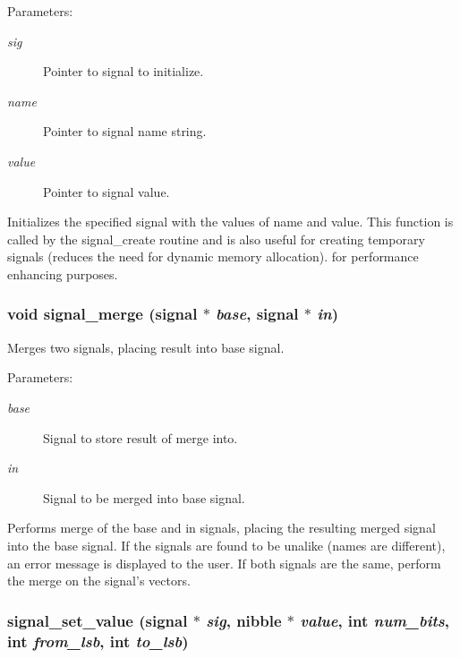 \begin{Desc}
\item[Parameters: ]\par
\begin{description}
\item[{\em 
sig}]Pointer to signal to initialize. \item[{\em 
name}]Pointer to signal name string. \item[{\em 
value}]Pointer to signal value.\end{description}
\end{Desc}
Initializes the specified signal with the values of name and value. This function is called by the signal\_\-create routine and is also useful for creating temporary signals (reduces the need for dynamic memory allocation). for performance enhancing purposes. 
\subsubsection{\setlength{\rightskip}{0pt plus 5cm}void signal\_\-merge ({\bf signal} $\ast$ {\em base}, {\bf signal} $\ast$ {\em in})}\label{signal_8c_a2}


Merges two signals, placing result into base signal.

\begin{Desc}
\item[Parameters: ]\par
\begin{description}
\item[{\em 
base}]Signal to store result of merge into. \item[{\em 
in}]Signal to be merged into base signal.\end{description}
\end{Desc}
Performs merge of the base and in signals, placing the resulting merged signal into the base signal. If the signals are found to be unalike (names are different), an error message is displayed to the user. If both signals are the same, perform the merge on the signal's vectors. 
\subsubsection{ signal\_\-set\_\-value ({\bf signal} $\ast$ {\em sig}, {\bf nibble} $\ast$ {\em value}, int {\em num\_\-bits}, int {\em from\_\-lsb}, int {\em to\_\-lsb})}\label{signal_8c_a5}


